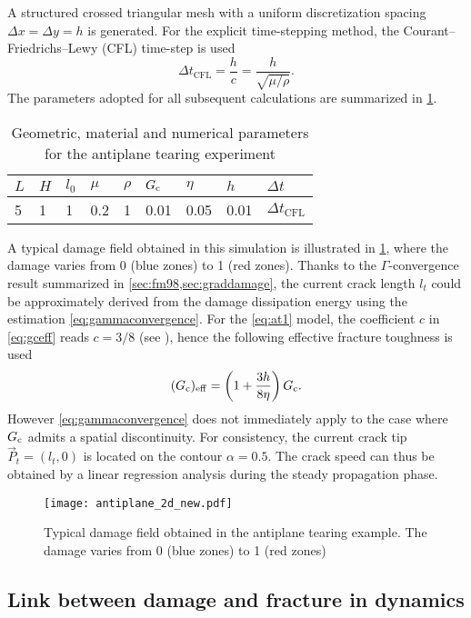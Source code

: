 A structured crossed triangular mesh with a uniform discretization spacing $\Delta x=\Delta y=h$ is generated. For the explicit time-stepping method, the Courant–Friedrichs–Lewy (CFL) time-step is used
\begin{equation} \label{eq:tcfl}
\Delta t_\mathrm{CFL}=\frac{h}{c}=\frac{h}{\sqrt{\mu/\rho}}.
\end{equation}
The parameters adopted for all subsequent calculations are summarized in \cref{tab:paraanti}.
\begin{table}[htbp]
\centering
\caption{Geometric, material and numerical parameters for the antiplane tearing experiment} \label{tab:paraanti}
\begin{tabular}{lllllllll} \toprule
$L$ & $H$ & $l_0$ & $\mu$ & $\rho$ & $G_\mathrm{c}$ & $\eta$ & $h$ & $\Delta t$\\ \midrule
5 & 1 & 1 & 0.2 & 1 & 0.01 & 0.05 & 0.01 & $\Delta t_\mathrm{CFL}$ \\ \bottomrule
\end{tabular}
\end{table}
A typical damage field obtained in this simulation is illustrated in \cref{fig:antiplane_2d_new}, where the damage varies from 0 (blue zones) to 1 (red zones). Thanks to the $\Gamma$-convergence result summarized in \cref{sec:fm98,sec:graddamage}, the current crack length $l_t$ could be approximately derived from the damage dissipation energy using the estimation \eqref{eq:gammaconvergence}. For the \eqref{eq:at1} model, the coefficient $c$ in \eqref{eq:gceff} reads $c=3/8$ (see \cite{HossainHsuehBourdinBhattachary:2014}), hence the following effective fracture toughness is used
\[
(G_\mathrm{c})_\mathrm{eff}=\left(1+\frac{3h}{8\eta}\right)G_\mathrm{c}.
\]
However \eqref{eq:gammaconvergence} does not immediately apply to the case where $G_\mathrm{c}$ admits a spatial discontinuity. For consistency, the current crack tip $\vec{P}_t=(l_t,0)$ is located on the contour $\alpha=0.5$. The crack speed can thus be obtained by a linear regression analysis during the steady propagation phase.
\begin{figure}[htbp]
\centering
\texttt{[image: antiplane\_2d\_new.pdf]}
\caption{Typical damage field obtained in the antiplane tearing example. The damage varies from 0 (blue zones) to 1 (red zones)} \label{fig:antiplane_2d_new}
\end{figure}

\subsection{Link between damage and fracture in dynamics} \label{sec:homo}
